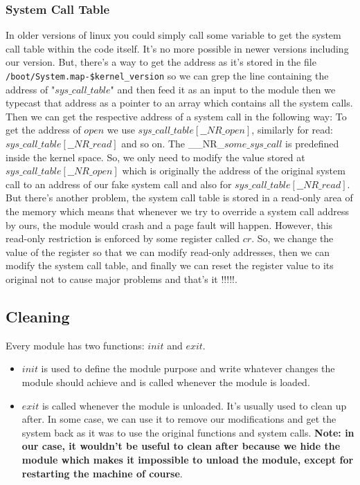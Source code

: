 \documentclass[12pt]{article}
\begin{document}
	 \subsubsection{System Call Table}
	 In older versions of linux you could simply call some variable to get the system call table within the code itself. It's no more possible in newer versions including our version. But, there's a way to get the address as it's stored in the file \lstinline|/boot/System.map-$kernel_version| so we can grep the line containing the address of "$sys\_call\_table$" and then feed it as an input to the module then we typecast that address as a pointer to an array which contains all the system calls. Then we can get the respective address of a system call in the following way:
	 To get the address of $open$ we use $sys\_call\_table[\_\_NR\_open]$, similarly for read: $sys\_call\_table[\_\_NR\_read]$ and so on. The \_\_NR\_$some\_sys\_call$ is predefined inside the kernel space. So, we only need to modify the value stored at $sys\_call\_table[\_\_NR\_open]$ which is originally the address of the original system call to an address of our fake system call and also for $sys\_call\_table[\_\_NR\_read]$.
	 But there's another problem, the system call table is stored in a read-only area of the memory which means that whenever we try to override a system call address by ours, the module would crash and a page fault will happen. However, this read-only restriction is enforced by some register called $cr$. So, we change the value of the register so that we can modify read-only addresses, then we can modify the system call table, and finally we can reset the register value to its original not to cause major problems and that's it !!!!!.
	 
	 \subsection{Cleaning}
	 Every module has two functions: $init$ and $exit$. 
	 \begin{itemize}
	 	\item $init$ is used to define the module purpose and write whatever changes the module should achieve and is called whenever the module is loaded.
	 	\item $exit$ is called  whenever the module is unloaded. It's usually used to clean up after. In some case, we can use it to remove our modifications and get the system back as it was to use the original functions and system calls. \textbf{Note: in our case, it wouldn't be useful to clean after because we hide the module which makes it impossible to unload the module, except for restarting the machine of course}.
	 \end{itemize} 
\end{document}
